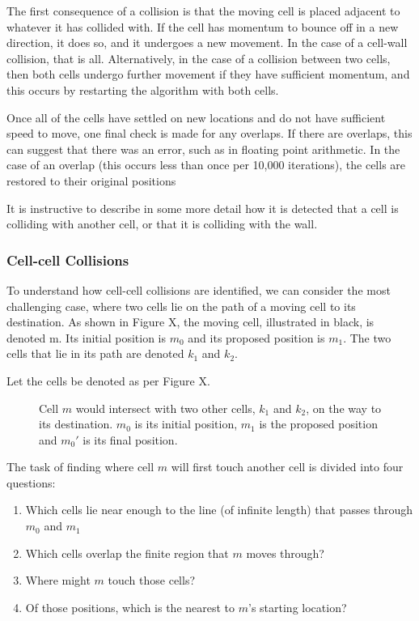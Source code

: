 \documentclass[12pt]{article}
\begin{document}
The first consequence of a collision is that the moving cell is placed 
adjacent to whatever it has collided with. If the cell has momentum to 
bounce off in a new direction, it does so, and it undergoes a new 
movement. In the case of a cell-wall collision, that is all. 
Alternatively, in the case of a collision between two cells, then both 
cells undergo further movement if they have sufficient momentum, and 
this occurs by restarting the algorithm with both cells.

Once all of the cells have settled on new locations and do not have 
sufficient speed to move, one final check is made for any overlaps. If 
there are overlaps, this can suggest that there was an error, such as in 
floating point arithmetic. In the case of an overlap (this occurs less 
than once per 10,000 iterations), the cells are restored to their 
original positions

It is instructive to describe in some more detail how it is detected 
that a cell is colliding with another cell, or that it is colliding with 
the wall.

\subsubsection{Cell-cell Collisions}
To understand how cell-cell collisions are identified, we can consider 
the most challenging case, where two cells lie on the path of a moving 
cell to its destination. As shown in Figure X, the moving cell, 
illustrated in black, is denoted m. Its initial position is \(m_0\) 
and its proposed position is \(m_1\). The two cells that lie in its 
path are denoted \(k_1\) and \(k_2\).

Let the cells be denoted as per Figure X.

\begin{figure}[H]
\centering
\caption{Cell \(m\) would intersect with two other 
  cells, \(k_1\) and \(k_2\), on the way to its destination. 
  \(m_0\) is its initial position, \(m_1\) is the proposed position and 
\(m_0'\) is its final position.}
\end{figure}

The task of finding where cell \(m\) will first touch another 
cell is divided into four questions:

\begin{enumerate}
\item Which cells lie near enough to the line (of infinite length) that 
passes through \(m_0\) and \(m_1\)
\item Which cells overlap the finite region that \(m\) moves 
through?
\item Where might \(m\) touch those cells?
\item Of those positions, which is the nearest to \(m\)'s 
starting location?
\end{enumerate}
\end{document}
